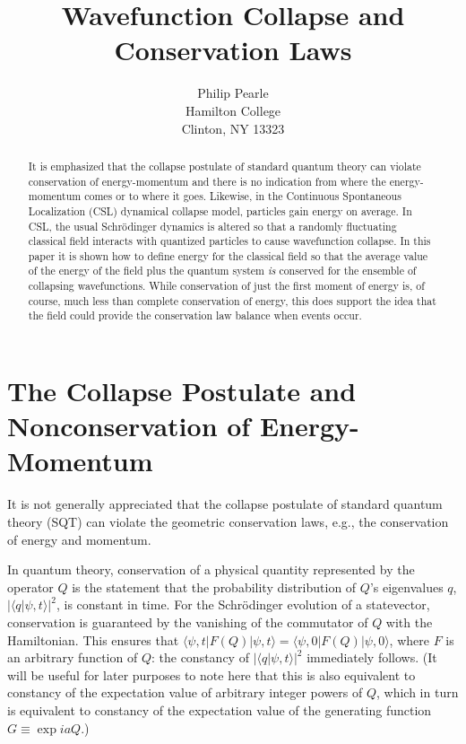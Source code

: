 \documentclass{article}
\begin{document}
\title{Wavefunction Collapse and Conservation Laws}
\author{Philip Pearle\\
Hamilton College\\
Clinton, NY 13323}
\date{}
\maketitle

\begin{abstract}

	It is emphasized that the collapse postulate of standard quantum theory can violate 
conservation of energy-momentum and there is no 
indication from where the energy-momentum comes or to where it goes.   
Likewise, in the Continuous Spontaneous Localization  (CSL) dynamical collapse model, 
particles gain energy on average.  
In CSL, the usual Schr\"odinger dynamics 
is altered so that a randomly fluctuating classical field 
interacts with quantized particles to cause wavefunction collapse.  In this paper it is 
shown how to define energy for the classical field so that the average value 
of the energy of the field plus the quantum system {\it is}  
conserved for the ensemble of collapsing wavefunctions. While conservation of 
just the first moment of energy is, of course, 
much less than complete conservation of energy, this does support the idea that 
the field could provide the conservation law balance when events occur.  

\end{abstract}


\section{The Collapse Postulate and Nonconservation of Energy-Momentum}\label{Postulate}


\hspace{\parindent}It is not generally appreciated that the collapse postulate of standard quantum theory (SQT) 
can violate the geometric conservation laws, e.g., the conservation of energy and momentum\cite{PearleAcadSci}. 

	In quantum theory, conservation of a physical quantity represented by the operator $Q$ is the statement 
that the probability distribution of $Q$'s eigenvalues $q$, $|\langle q|\psi,t\rangle|^{2}$, is constant in time. 
For the Schr\"odinger evolution of a statevector, conservation is guaranteed by the vanishing of the commutator 
of $Q$ with the Hamiltonian.  This ensures that 
$\langle \psi,t|F(Q)|\psi,t\rangle=\langle \psi,0|F(Q)|\psi,0\rangle$, where $F$ is an arbitrary 
function of $Q$: the constancy of $|\langle q|\psi,t\rangle|^{2}$ immediately follows.  
(It will be useful for later purposes to note here that 
this is also equivalent to constancy of the expectation value of arbitrary integer powers of $Q$, 
which in turn is equivalent to constancy of the expectation value of the generating function $G\equiv \exp iaQ$.)
\end{document}
